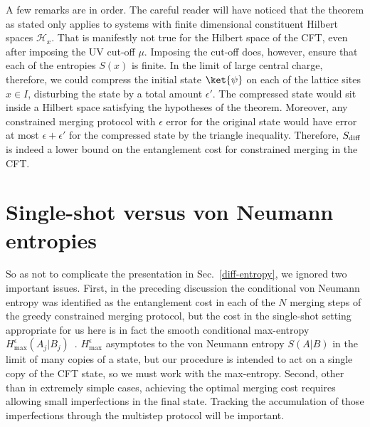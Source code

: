 \documentclass[12pt]{article}
\def\sdiff{S_{\rm diff}}
\newcommand{\Hmax}{H_{\max}}
\begin{document}
A few remarks are in order. The careful reader will have noticed that the theorem as stated only applies to systems with finite dimensional constituent Hilbert spaces $\mathcal{H}_x$. That is manifestly not true for the Hilbert space of the CFT, even after imposing the UV cut-off  $\mu$. Imposing the cut-off does, however, ensure that each of the entropies $S(x)$ is finite. In the limit of large central charge, therefore, we could compress the initial state $\ket{\psi}$ on each of the lattice sites $x \in I$, disturbing the state by a total amount $\epsilon'$. The compressed state would sit inside a Hilbert space satisfying the hypotheses of the theorem. Moreover, any constrained merging protocol with $\epsilon$ error for the original state would have error at most $\epsilon + \epsilon'$ for the compressed state by the triangle inequality. Therefore, $\sdiff$ is indeed a lower bound on the entanglement cost for constrained merging in the CFT.


\section{Single-shot versus von Neumann entropies} \label{sec:single-shot}

So as not to complicate the presentation in Sec.~\ref{diff-entropy}, we ignored two important issues. First, in the preceding discussion the conditional von Neumann entropy was identified as the entanglement cost in each of the $N$ merging steps of the greedy constrained merging protocol, but the cost in the single-shot setting appropriate for us here is in fact the smooth conditional max-entropy $\Hmax^\epsilon(A_j|B_j)$~\cite{oneshot}. $\Hmax^\epsilon$ asymptotes to the von Neumann entropy $S(A|B)$ in the limit of many copies of a state, but our procedure is intended to act on a single copy of the CFT state, so we must work with the max-entropy. Second, other than in extremely simple cases, achieving the optimal merging cost requires allowing small imperfections in the final state. Tracking the accumulation of those imperfections through the multistep protocol will be important.
\end{document}
